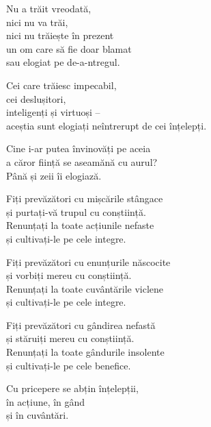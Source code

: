 Nu a trăit vreodată,\\
nici nu va trăi,\\
nici nu trăiește în prezent \\
un om care să fie doar blamat\\
sau elogiat pe de-a-ntregul.


Cei care trăiesc impecabil,\\
cei deslușitori,\\
inteligenți și virtuoși –\\
aceștia sunt elogiați neîntrerupt de cei înțelepți.


Cine i-ar putea învinovăți pe aceia\\
a căror ființă se aseamănă cu aurul?\\
Până și zeii îi elogiază.


Fiți prevăzători cu mișcările stângace\\
și purtați-vă trupul cu conștiință.\\
Renunțați la toate acțiunile nefaste\\
și cultivați-le pe cele integre.


Fiți prevăzători cu enunțurile născocite\\
și vorbiți mereu cu conștiință.\\
Renunțați la toate cuvântările viclene\\
și cultivați-le pe cele integre.


Fiți prevăzători cu gândirea nefastă\\
și stăruiți mereu cu conștiință.\\
Renunțați la toate gândurile insolente\\
și cultivați-le pe cele benefice.


Cu pricepere se abțin înțelepții,\\
în acțiune, în gând\\
și în cuvântări.
